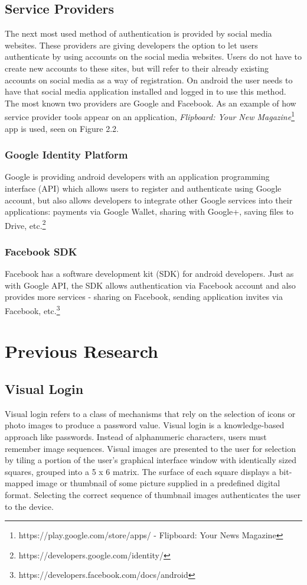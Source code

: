 \subsection{Service Providers}
The next most used method of authentication is provided by social media websites. These providers are giving developers the option to let users authenticate by using accounts on the social media websites. Users do not have to create new accounts to these sites, but will refer to their already existing accounts on social media as a way of registration. On android the user needs to have that social media application installed and logged in to use this method. The most known two providers are Google and Facebook. As an example of how service provider tools appear on an application, \textit{Flipboard: Your New Magazine}\footnote[8]{https://play.google.com/store/apps/ - Flipboard: Your News Magazine} app is used, seen on Figure 2.2.

\subsubsection{Google Identity Platform}
Google is providing android developers with an application programming interface (API) which allows users to register and authenticate using Google account, but also allows developers to integrate other Google services into their applications: payments via Google Wallet, sharing with Google+, saving files to Drive, etc.\footnote[9]{https://developers.google.com/identity/}

\subsubsection{Facebook SDK}
Facebook has a software development kit (SDK) for android developers. Just as with Google API, the SDK allows authentication via Facebook account and also provides more services - sharing on Facebook, sending application invites via Facebook, etc.\footnote[10]{https://developers.facebook.com/docs/android}

\section{Previous Research}

\subsection{Visual Login}
Visual login refers to a class of mechanisms that rely on the selection of icons or photo images to produce a
password value. Visual login is a knowledge-based approach like passwords. Instead of alphanumeric characters, users must remember image sequences. Visual images are presented to the user for selection by tiling a portion of the user's graphical interface window with identically sized squares, grouped into a 5 x 6 matrix. The surface of each square displays a bit-mapped image or thumbnail of some picture supplied in a predefined digital format. Selecting the correct sequence of thumbnail images authenticates the user to the device. \cite{jansen2003authenticating}

